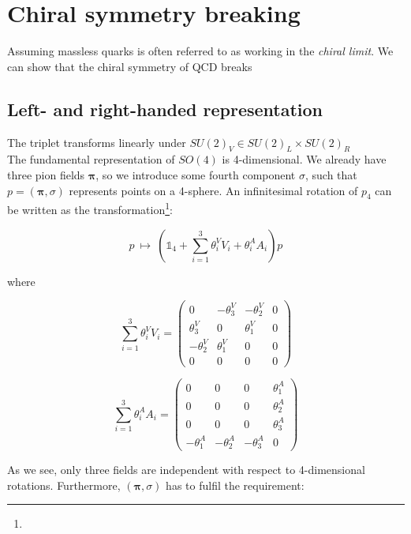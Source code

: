 \documentclass[10pt]{report}
\begin{document}
	\section{Chiral symmetry breaking}
	Assuming massless quarks is often referred to as working in the \emph{chiral limit}. We can show that the chiral symmetry of QCD breaks\\
	
	\subsection{Left- and right-handed representation}
	The triplet transforms linearly under $SU(2)_V \in SU(2)_L\times SU(2)_R$\\
	
	The fundamental representation of $SO(4)$ is 4-dimensional. We already have three pion fields $\bm{\pi}$, so we introduce some fourth component $\sigma$, such that $p=(\bm{\pi},\sigma)$ represents points on a 4-sphere. An infinitesimal rotation of $p_4$ can be written as the transformation\footnote{}:
	
	\begin{equation}
		p \:\mapsto\: \left( \mathds{1}_4 + \sum_{i=1}^3 \theta_i^VV_i + \theta_i^AA_i \right)p
	\end{equation}
	
	where
	
	\begin{equation}
		\sum_{i=1}^3 \theta_i^VV_i = \begin{pmatrix}
		0 & -\theta_3^V & -\theta_2^V & 0\\
		\theta_3^V & 0 & \theta_1^V & 0\\
		-\theta_2^V & \theta_1^V & 0 & 0\\
		0 & 0 & 0 & 0
		\end{pmatrix}
	\end{equation}
	
	\begin{equation}
		\sum_{i=1}^3 \theta_i^AA_i = \begin{pmatrix}
		0 & 0 & 0 & \theta_1^A\\
		0 & 0 & 0 & \theta_2^A\\
		0 & 0 & 0 & \theta_3^A\\
		-\theta_1^A & -\theta_2^A & -\theta_3^A & 0
		\end{pmatrix}
	\end{equation}
	
	As we see, only three fields are independent with respect to 4-dimensional rotations. Furthermore, $(\bm{\pi},\sigma)$ has to fulfil the requirement:
	
\end{document}
